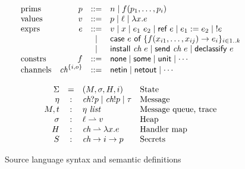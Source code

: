 \documentclass{sig-alternate}
\theoremstyle{definition}
\newcommand{\aset}[1]{\{#1\}}
\newcommand{\sfmt}[1]{\textsf{#1}}
\newcommand{\sch}{\textit{ch}}
\newcommand{\loc}{\ell}
\newcommand{\sassign}[2]{#1 := #2}
\newcommand{\scase}[2]{\sfmt{case}~#1~\sfmt{of}~#2}
\newcommand{\sderef}[1]{!#1}
\newcommand{\sinstall}[2]{\sfmt{install}~#1~#2}
\newcommand{\sdeclassify}[1]{\sfmt{declassify}~#1}
\newcommand{\sref}[1]{\sfmt{ref}~#1}
\newcommand{\ssend}[2]{\sfmt{send}~#1~#2}
\newcommand{\sunit}{\sfmt{unit}}
\newcommand{\partialfun}{\rightharpoonup}
\newcommand{\xv}{p}
\newcommand{\typ}{\tau}
\newcommand{\tint}{\textit{int}}
\newcommand{\evt}{\eta}
\begin{document}
{\begin{figure}[t]
  \begin{displaymath}
    \begin{array}{lrcl}
      \hbox{prims} & \xv & ::= & n \mid f(\xv_1, \ldots, \xv_i)  \\
      \hbox{values} & v & ::= & \xv \mid \loc \mid \lambda x.e \\
      \hbox{exprs} & e & ::= &
      v
      \mid x
      \mid e_1~e_2
      \mid \sref{e}
      \mid \sassign{e_1}{e_2}
      \mid \;\sderef{e} \\
      && \mid & \scase{e}{\aset{f(x_{i1}, \ldots, x_{ij}) \rightarrow
          e_i}_{i\in 1..k}} \\
      && \mid & \sinstall{\sch}{e}
      \mid \ssend{\sch}{e}
      \mid \sdeclassify{e} \\
      \hbox{constrs} & f & ::= &
      \sfmt{none} \mid \sfmt{some} \mid \sunit \mid \cdots \\
      \hbox{channels} & \sch^{\{i,o\}} & ::= & \sfmt{netin} \mid \sfmt{netout}
      \mid \cdots \\
    \end{array}
  \end{displaymath}    

    
  \begin{displaymath}
    \begin{array}{rcll}
      \Sigma & = & (M, \sigma, H,i) & \hbox{State} \\
      \evt & : & \sch ? p \mid \sch ! p \mid \tau & \hbox{Message} \\
      M, t & : & \evt ~ \textit{list} & \hbox{Message queue, trace}\\
      \sigma & : & \loc \partialfun  v & \hbox{Heap} \\
      H & : & \sch \partialfun \lambda x.e & \hbox{Handler map} \\
      S & : & \sch \rightarrow i \rightarrow p & \hbox{Secrets}
    \end{array}
  \end{displaymath}
  \caption{Source language syntax and semantic definitions}
  \label{fig:lang}
\end{figure}

}
\end{document}
